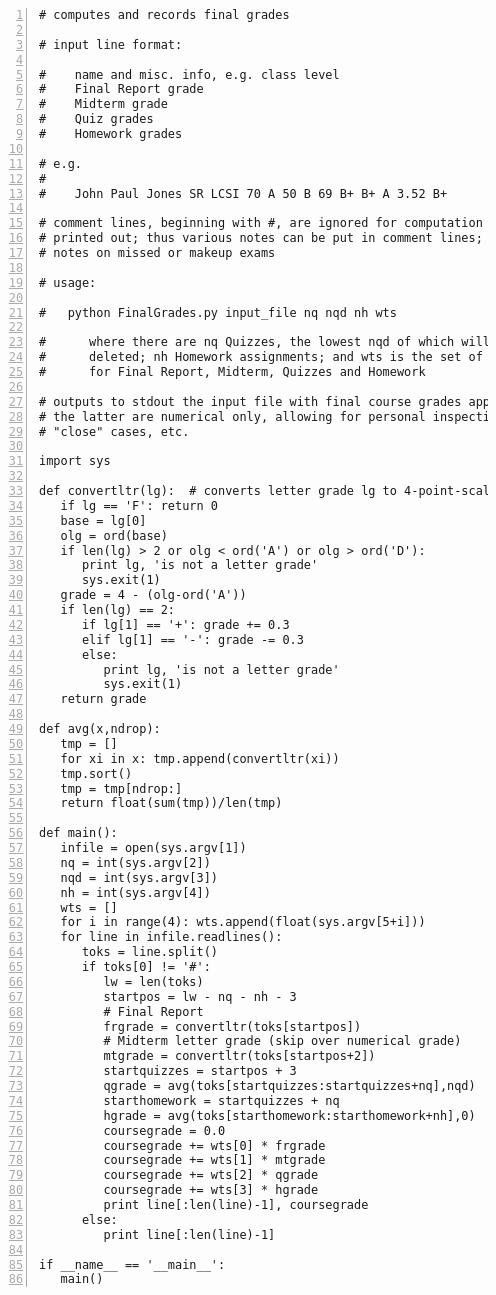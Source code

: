 \begin{Verbatim}[fontsize=\relsize{-2},numbers=left]
# computes and records final grades

# input line format:

#    name and misc. info, e.g. class level
#    Final Report grade
#    Midterm grade
#    Quiz grades
#    Homework grades

# e.g. 
#
#    John Paul Jones SR LCSI 70 A 50 B 69 B+ B+ A 3.52 B+

# comment lines, beginning with #, are ignored for computation but are
# printed out; thus various notes can be put in comment lines; e.g.
# notes on missed or makeup exams 

# usage:  

#   python FinalGrades.py input_file nq nqd nh wts 

#      where there are nq Quizzes, the lowest nqd of which will be
#      deleted; nh Homework assignments; and wts is the set of weights
#      for Final Report, Midterm, Quizzes and Homework

# outputs to stdout the input file with final course grades appended;
# the latter are numerical only, allowing for personal inspection of
# "close" cases, etc.

import sys

def convertltr(lg):  # converts letter grade lg to 4-point-scale
   if lg == 'F': return 0
   base = lg[0]
   olg = ord(base)
   if len(lg) > 2 or olg < ord('A') or olg > ord('D'):
      print lg, 'is not a letter grade'
      sys.exit(1)
   grade = 4 - (olg-ord('A'))
   if len(lg) == 2:
      if lg[1] == '+': grade += 0.3
      elif lg[1] == '-': grade -= 0.3
      else:
         print lg, 'is not a letter grade'
         sys.exit(1)
   return grade

def avg(x,ndrop):
   tmp = []
   for xi in x: tmp.append(convertltr(xi)) 
   tmp.sort()
   tmp = tmp[ndrop:]
   return float(sum(tmp))/len(tmp)

def main():
   infile = open(sys.argv[1])
   nq = int(sys.argv[2])
   nqd = int(sys.argv[3])
   nh = int(sys.argv[4])
   wts = []
   for i in range(4): wts.append(float(sys.argv[5+i]))
   for line in infile.readlines():
      toks = line.split()
      if toks[0] != '#':
         lw = len(toks)
         startpos = lw - nq - nh - 3
         # Final Report
         frgrade = convertltr(toks[startpos])
         # Midterm letter grade (skip over numerical grade)
         mtgrade = convertltr(toks[startpos+2])
         startquizzes = startpos + 3
         qgrade = avg(toks[startquizzes:startquizzes+nq],nqd)
         starthomework = startquizzes + nq
         hgrade = avg(toks[starthomework:starthomework+nh],0)
         coursegrade = 0.0
         coursegrade += wts[0] * frgrade
         coursegrade += wts[1] * mtgrade
         coursegrade += wts[2] * qgrade
         coursegrade += wts[3] * hgrade
         print line[:len(line)-1], coursegrade
      else: 
         print line[:len(line)-1] 

if __name__ == '__main__':
   main()
\end{Verbatim}

